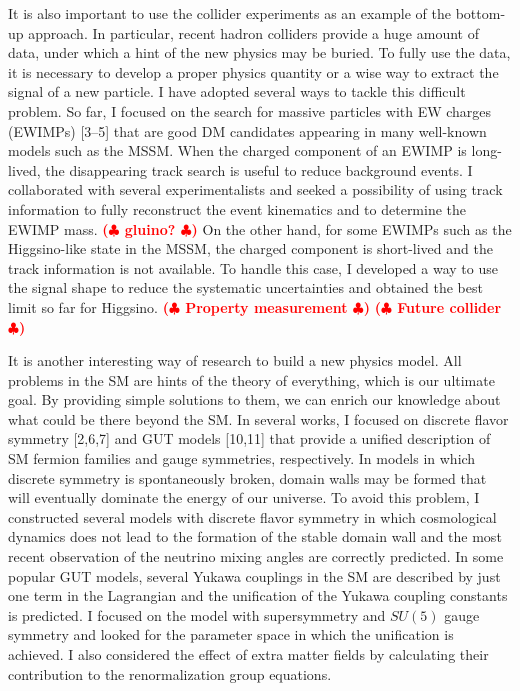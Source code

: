 \documentclass[12pt,notitlepage]{article}
\def\rem#1{ {\bf\textcolor{red}{($\clubsuit$ #1 $\clubsuit$)}}}
\begin{document}
It is also important to use the collider experiments as an example of the bottom-up approach.
In particular, recent hadron colliders provide a huge amount of data, under which a hint of the new physics may be buried.
To fully use the data, it is necessary to develop a proper physics quantity or a wise way to extract the signal of a new particle.
I have adopted several ways to tackle this difficult problem.
So far, I focused on the search for massive particles with EW charges (EWIMPs) [3--5] that are good DM candidates appearing in many well-known models such as the MSSM.
When the charged component of an EWIMP is long-lived, the disappearing track search is useful to reduce background events.
I collaborated with several experimentalists and seeked a possibility of using track information to fully reconstruct the event kinematics and to determine the EWIMP mass.\rem{gluino?}
On the other hand, for some EWIMPs such as the Higgsino-like state in the MSSM, the charged component is short-lived and the track information is not available.
To handle this case, I developed a way to use the signal shape to reduce the systematic uncertainties and obtained the best limit so far for Higgsino.
\rem{Property measurement}
\rem{Future collider}

It is another interesting way of research to build a new physics model.
All problems in the SM are hints of the theory of everything, which is our ultimate goal.
By providing simple solutions to them, we can enrich our knowledge about what could be there beyond the SM.
In several works, I focused on discrete flavor symmetry [2,6,7] and GUT models [10,11] that provide a unified description of SM fermion families and gauge symmetries, respectively.
In models in which discrete symmetry is spontaneously broken, domain walls may be formed that will eventually dominate the energy of our universe.
To avoid this problem, I constructed several models with discrete flavor symmetry in which cosmological dynamics does not lead to the formation of the stable domain wall and the most recent observation of the neutrino mixing angles are correctly predicted.
In some popular GUT models, several Yukawa couplings in the SM are described by just one term in the Lagrangian and the unification of the Yukawa coupling constants is predicted.
I focused on the model with supersymmetry and $SU(5)$ gauge symmetry and looked for the parameter space in which the unification is achieved.
I also considered the effect of extra matter fields by calculating their contribution to the renormalization group equations.
\end{document}
